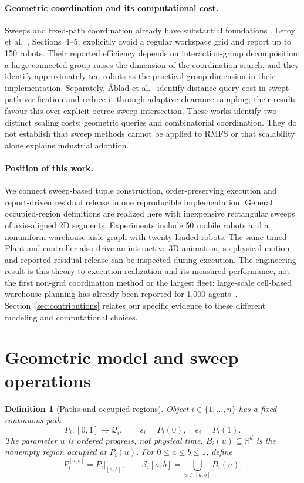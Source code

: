 \documentclass[11pt,a4paper]{article}
\newtheorem{definition}{Definition}
\theoremstyle{remark}
\newcommand{\Sw}{\mathcal S}
\begin{document}
\paragraph{Geometric coordination and its computational cost.}
Sweeps and fixed-path coordination already have substantial foundations
\cite{odonnell1989,leroy1999,gregoire2015,cap2016}. Leroy et
al.~\cite{leroy1999}, Sections~4--5, explicitly avoid a regular workspace
grid and report up to 150 robots. Their reported efficiency depends on
interaction-group decomposition: a large connected group raises the
dimension of the coordination search, and they identify approximately ten
robots as the practical group dimension in their implementation.
Separately, \AA blad et al.~\cite{ablad2021} identify distance-query cost in
swept-path verification and reduce it through adaptive clearance sampling;
their results favour this over explicit octree sweep intersection.
These works identify two distinct scaling costs: geometric queries and
combinatorial coordination. They do not establish that sweep methods
cannot be applied to RMFS or that scalability alone explains industrial
adoption.

\paragraph{Position of this work.}
We connect sweep-based tuple construction, order-preserving execution and
report-driven residual release in one reproducible implementation. General
occupied-region definitions are realized here with inexpensive rectangular
sweeps of axis-aligned 2D segments. Experiments include 50 mobile robots
and a nonuniform warehouse aisle graph with twenty loaded robots.
The same timed Plant and controller also drive an interactive 3D animation,
so physical motion and reported residual release can be inspected during
execution. The engineering result is this theory-to-execution realization and its measured
performance, not the first non-grid coordination method or the largest
fleet: large-scale cell-based warehouse planning has already been reported
for 1,000 agents~\cite{li2021}. Section~\ref{sec:contributions} relates our
specific evidence to these different modeling and computational choices.

\section{Geometric model and sweep operations}

\begin{definition}[Paths and occupied regions]
Object $i\in\{1,\ldots,n\}$ has a fixed continuous path
\begin{equation}
 P_i:[0,1]\longrightarrow\mathcal Q_i,\qquad
 s_i=P_i(0),\quad e_i=P_i(1).
 \label{eq:path}
\end{equation}
The parameter $u$ is ordered progress, not physical time.
$B_i(u)\subseteq\mathbb R^d$ is the nonempty region occupied at $P_i(u)$.
For $0\le a\le b\le1$, define
\begin{equation}
 P_i^{[a,b]}=P_i|_{[a,b]},\qquad
 \Sw_i[a,b]=\bigcup_{u\in[a,b]}B_i(u).
 \label{eq:sweep}
\end{equation}
\end{definition}
\end{document}
